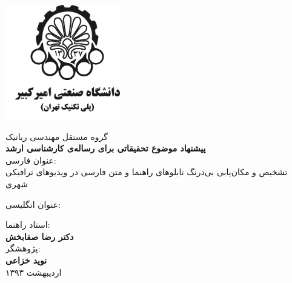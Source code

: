\documentclass[12pt,a4paper]{article}
\theoremstyle{definition}
\theoremstyle{theorem}
\theoremstyle{definition}
\begin{document}
\thispagestyle{empty}
\vspace*{-28mm}
\centerline{\includegraphics[height=5cm]{logo.png}}
\begin{center}
\vspace{-6mm}

گروه مستقل مهندسی رباتیک
\\[1.5cm]

{\large
\textbf { 
پیشنهاد موضوع تحقیقاتی برای رساله‌ی کارشناسی ارشد
}
\\[1.2cm]
عنوان فارسی:
\\[.4cm]
}
\baselineskip=1cm
{\Large \titr
تشخیص و مکان‌یابی بی‌درنگ تابلوهای راهنما و متن فارسی در ویدیوهای ترافیکی شهری
\\[1cm]
}

{\large 
عنوان انگلیسی:
\\[.4cm]
}

{\Large \titr
{}
\vspace{-9mm}
}

{\large
استاد راهنما:
}
\\[.3cm]
\textbf{\large {\nastaliq دکتر رضا صفابخش}}
\\[.5cm]

{\large
 پژوهشگر:
}
\\[.3cm]
\textbf{\large {\nastaliq نوید خزاعی}}
\\[.5cm]
{\large
اردیبهشت ۱۳۹۳
}
\end{center}
\newpage
\baselineskip=1cm
\end{document}
